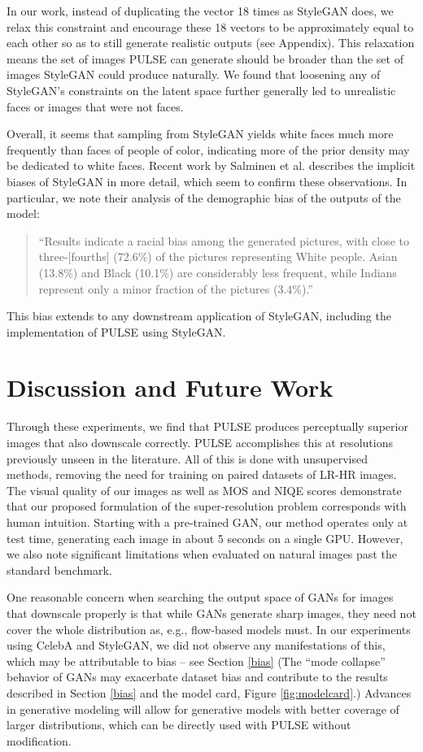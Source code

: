 \documentclass[10pt,twocolumn,letterpaper]{article}
\begin{document}
In our work, instead of duplicating the vector 18 times as StyleGAN does, we relax this constraint and encourage these 18 vectors to be approximately equal to each other so as to still generate realistic outputs (see Appendix). This relaxation means the set of images PULSE can generate should be broader than the set of images StyleGAN could produce naturally. We found that loosening any of StyleGAN's constraints on the latent space further generally led to unrealistic faces or images that were not faces.

Overall, it seems that sampling from StyleGAN yields white faces much more frequently than faces of people of color, indicating more of the prior density may be dedicated to white faces. Recent work by Salminen et al. \cite{Salminen_Jung_Chowdhury_Jansen_2020b} describes the implicit biases of StyleGAN in more detail, which seem to confirm these observations. In particular, we note their analysis of the demographic bias of the outputs of the model:
\begin{quote}
“Results indicate a racial bias among the generated pictures, with close to three-[fourths] (72.6\%) of the pictures representing White people. Asian (13.8\%) and Black (10.1\%) are considerably less frequent, while Indians represent only a minor fraction of the pictures (3.4\%).”
\end{quote}
This bias extends to any downstream application of StyleGAN, including the implementation of PULSE using StyleGAN.




\section{Discussion and Future Work}
Through these experiments, we find that PULSE produces perceptually superior images that also downscale correctly. PULSE accomplishes this at resolutions previously unseen in the literature. All of this is done with unsupervised methods, removing the need for training on paired datasets of LR-HR images. The visual quality of our images as well as MOS and NIQE scores demonstrate that our proposed formulation of the super-resolution problem corresponds with human intuition. Starting with a pre-trained GAN, our method operates only at test time, generating each image in about 5 seconds on a single GPU. However, we also note significant limitations when evaluated on natural images past the standard benchmark.

One reasonable concern when searching the output space of GANs for images that downscale properly is that while GANs generate sharp images, they need not cover the whole distribution as, e.g., flow-based models must. In our experiments using CelebA and StyleGAN, we did not observe any manifestations of this, which may be attributable to bias – see Section \ref{bias} (The ``mode collapse'' behavior of GANs may exacerbate dataset bias and contribute to the results described in Section \ref{bias} and the model card, Figure \ref{fig:modelcard}.) Advances in generative modeling will allow for generative models with better coverage of larger distributions, which can be directly used with PULSE without modification.
\end{document}
